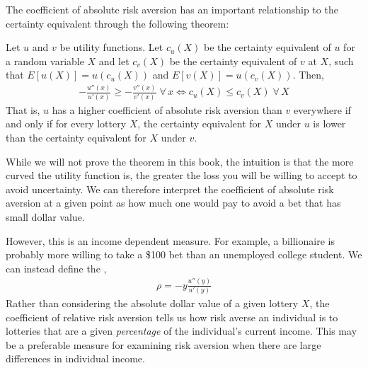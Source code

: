The coefficient of absolute risk aversion has an important relationship to the certainty equivalent through the following theorem:

\begin{theorem*}
    Let $u$ and $v$ be utility functions. Let $c_u(X)$ be the certainty equivalent of $u$ for a random variable $X$ and let $c_v(X)$ be the certainty equivalent of $v$ at $X$, such that $E[u(X)] = u(c_u(X))$ and $E[v(X)] = u(c_v(X))$. Then,
    \begin{align*}
        -\frac{u''(x)}{u'(x)} \geq -\frac{v''(x)}{v'(x)} \; \forall \, x \iff c_u(X) \leq c_v(X) \; \forall \, X
    \end{align*}
    That is, $u$ has a higher coefficient of absolute risk aversion than $v$ everywhere if and only if for every lottery $X$, the certainty equivalent for $X$ under $u$ is lower than the certainty equivalent for $X$ under $v$. 
\end{theorem*}

While we will not prove the theorem in this book, the intuition is that the more curved the utility function is, the greater the loss you will be willing to accept to avoid uncertainty. We can therefore interpret the coefficient of absolute risk aversion at a given point as how much one would pay to avoid a bet that has small dollar value.

However, this is an income dependent measure. For example, a billionaire is probably more willing to take a \$100 bet than an unemployed college student. We can instead define the , 
\begin{align*}
    \rho = -y \frac{u''(y)}{u'(y)}
\end{align*}
Rather than considering the absolute dollar value of a given lottery $X$, the coefficient of relative risk aversion tells us how risk averse an individual is to lotteries that are a given \emph{percentage} of the individual's current income. This may be a preferable measure for examining risk aversion when there are large differences in individual income. 

